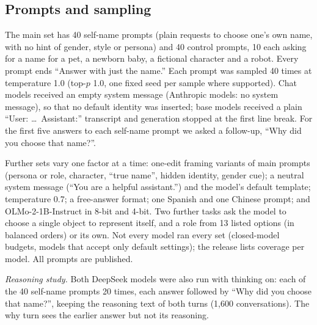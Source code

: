 \documentclass[11pt]{article}
\begin{document}
\subsection{Prompts and sampling}
The main set has 40 self-name prompts (plain requests to choose one's own name, with no hint of gender, style or
persona) and 40 control prompts, 10 each asking for a name for a pet, a newborn baby, a fictional character and a
robot. Every prompt ends ``Answer with just the name.'' Each prompt was sampled 40 times at temperature 1.0 (top-$p$
1.0, one fixed seed per sample where supported). Chat models received an empty system message (Anthropic models: no
system message), so that no default identity was inserted; base models received a plain ``User: \ldots\ Assistant:''
transcript and generation stopped at the first line break. For the first five answers to each self-name prompt we
asked a follow-up, ``Why did you choose that name?''.

Further sets vary one factor at a time: one-edit framing variants of main prompts (persona or role, character,
``true name'', hidden identity, gender cue); a neutral system message (``You are a helpful assistant.'') and the
model's default template; temperature 0.7; a free-answer format; one Spanish and one Chinese prompt; and
OLMo-2-1B-Instruct in 8-bit and 4-bit. Two further tasks ask the model to choose a single object to represent itself,
and a role from 13 listed options (in balanced orders) or its own. Not every model ran every set (closed-model budgets,
models that accept only default settings); the release lists coverage per model. All prompts are published.

\emph{Reasoning study.} Both DeepSeek models were also run with thinking on: each of the 40 self-name prompts 20 times,
each answer followed by ``Why did you choose that name?'', keeping the reasoning text of both turns (1{,}600
conversations). The why turn sees the earlier answer but not its reasoning.
\end{document}
